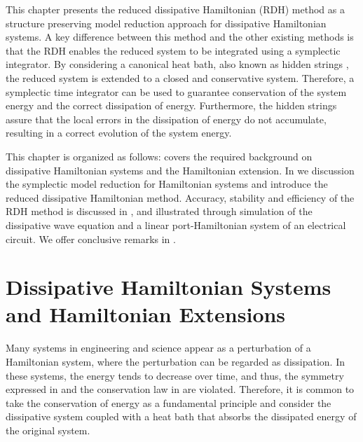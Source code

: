This chapter presents the reduced dissipative Hamiltonian (RDH) method as a structure preserving model reduction approach for dissipative Hamiltonian systems. A key difference between this method and the other existing methods is that the RDH enables the reduced system to be integrated using a symplectic integrator. By considering a canonical heat bath, also known as hidden strings \cite{figotin2007hamiltonian,figotin2005spectral}, the reduced system is extended to a closed and conservative system. Therefore, a symplectic time integrator can be used to guarantee conservation of the system energy and the correct dissipation of energy. Furthermore, the hidden strings assure that the local errors in the dissipation of energy do not accumulate, resulting in a correct evolution of the system energy.  

This chapter is organized as follows:  covers the required background on dissipative Hamiltonian systems and the Hamiltonian extension. In  we discussion the symplectic model reduction for Hamiltonian systems and introduce the reduced dissipative Hamiltonian method. Accuracy, stability and efficiency of the RDH method is discussed in , and illustrated through simulation of the dissipative wave equation and a linear port-Hamiltonian system of an electrical circuit. We offer conclusive remarks in .


\section{Dissipative Hamiltonian Systems and Hamiltonian Extensions} \label{p3.sec:2}

Many systems in engineering and science appear as a perturbation of a Hamiltonian system, where the perturbation can be regarded as dissipation. In these systems, the energy tends to decrease over time, and thus, the symmetry expressed in  and the conservation law in  are violated. Therefore, it is common to take the conservation of energy as a fundamental principle and consider the dissipative system coupled with a heat bath that absorbs the dissipated energy of the original system. 

